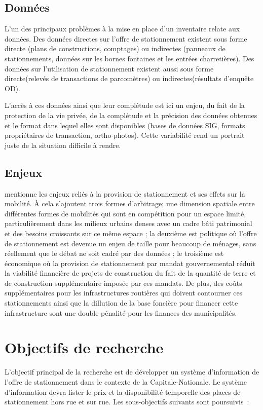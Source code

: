 \subsection{Données}

L'un des principaux problèmes à la mise en place d'un inventaire relate aux données. Des données directes sur l'offre de stationnement existent sous forme directe (plans de constructions, comptages) ou indirectes (panneaux de stationnements, données sur les bornes fontaines et les entrées charretières). Des données sur l'utilisation de stationnement existent aussi sous forme directe(relevés de transactions de parcomètres) ou indirectes(résultats d'enquête OD).\par
L'accès à ces données ainsi que leur complétude est ici un enjeu, du fait de la protection de la vie privée, de la complétude et la précision des données obtenues et le format dans lequel elles sont disponibles (bases de données SIG, formats propriétaires de transaction, ortho-photos). Cette variabilité rend un portrait juste de la situation difficile à rendre.

\subsection{Enjeux}

\textcite{Bourdeau:MethodologieAnalyse:2014} mentionne les enjeux reliés à la provision de stationnement et ses effets sur la mobilité. À cela s'ajoutent trois formes d'arbitrage; une dimension spatiale entre différentes formes de mobilités qui sont en compétition pour un espace limité, particulièrement dans les milieux urbains denses avec un cadre bâti patrimonial et des besoins croissants sur ce même espace ; la deuxième est politique où l'offre de stationnement est devenue un enjeu de taille pour beaucoup de ménages, sans réellement que le débat ne soit cadré par des données ; le troisième est économique où la provision de stationnement par mandat gouvernemental réduit la viabilité financière de projets de construction du fait de la quantité de terre et de construction supplémentaire imposée par ces mandats. De plus, des coûts supplémentaires pour les infrastructures routières qui doivent contourner ces stationnements  \fg{} ainsi que la dillution de la base foncière pour financer cette infrastructure sont une double pénalité pour les finances des municipalités. 

\section{Objectifs de recherche}  %
L'objectif principal de la recherche est de développer un système d'information de l'offre  de stationnement dans le contexte de la Capitale-Nationale. Le système d'information devra lister le prix et la disponibilité temporelle des places de stationnement hors rue et sur rue. Les sous-objectifs suivants sont poursuivis :

